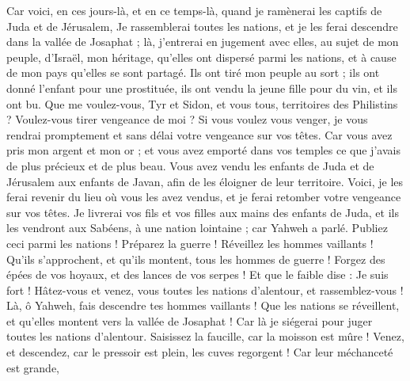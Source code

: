 \begin{multicols}{2}
\VerseOne{}Car voici, en ces jours-là, et en ce temps-là, quand je ramènerai les captifs de Juda et de Jérusalem,
Je rassemblerai toutes les nations, et je les ferai descendre dans la vallée de Josaphat ; là, j'entrerai en jugement avec elles, au sujet de mon peuple, d'Israël, mon héritage, qu’elles ont dispersé parmi les nations, et à cause de mon pays qu'elles se sont partagé.
Ils ont tiré mon peuple au sort ; ils ont donné l’enfant pour une prostituée, ils ont vendu la jeune fille pour du vin, et ils ont bu.
Que me voulez-vous, Tyr et Sidon, et vous tous, territoires des Philistins ? Voulez-vous tirer vengeance de moi ? Si vous voulez vous venger, je vous rendrai promptement et sans délai votre vengeance sur vos têtes.
Car vous avez pris mon argent et mon or ; et vous avez emporté dans vos temples ce que j’avais de plus précieux et de plus beau.
Vous avez vendu les enfants de Juda et de Jérusalem aux enfants de Javan, afin de les éloigner de leur territoire.
Voici, je les ferai revenir du lieu où vous les avez vendus, et je ferai retomber votre vengeance sur vos têtes.
Je livrerai vos fils et vos filles aux mains des enfants de Juda, et ils les vendront aux Sabéens, à une nation lointaine ; car Yahweh a parlé.
Publiez ceci parmi les nations ! Préparez la guerre ! Réveillez les hommes vaillants ! Qu’ils s’approchent, et qu’ils montent, tous les hommes de guerre !
Forgez des épées de vos hoyaux, et des lances de vos serpes ! Et que le faible dise : Je suis fort !
Hâtez-vous et venez, vous toutes les nations d'alentour, et rassemblez-vous ! Là, ô Yahweh, fais descendre tes hommes vaillants !
Que les nations se réveillent, et qu'elles montent vers la vallée de Josaphat ! Car là je siégerai pour juger toutes les nations d'alentour.
Saisissez la faucille, car la moisson est mûre ! Venez, et descendez, car le pressoir est plein, les cuves regorgent ! Car leur méchanceté est grande,

\end{multicols}
